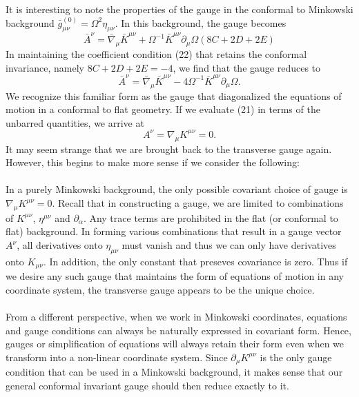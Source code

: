 \documentclass[10pt,letterpaper]{article}
\begin{document}
It is interesting to note the properties of the gauge in the conformal to Minkowski background $\bar g^{(0)}_{\mu\nu} = \Omega^2\eta_{\mu\nu}$. In this background, the gauge becomes
\begin{equation}
	\bar A^\nu  =\bar \nabla_\mu \bar K^{\mu\nu}+ \Omega^{-1}\bar K^{\mu\nu}\partial_\mu \Omega ( 8C +2D +2E)
\end{equation}
In maintaining the coefficient condition (22) that retains the conformal invariance, namely $8C+2D+2E=-4$, we find that the gauge reduces to
\begin{equation}
	\bar A^\nu =\bar \nabla_\mu \bar K^{\mu\nu} -4\Omega^{-1}\bar K^{\mu\nu}\partial_\mu \Omega.
\end{equation}
We recognize this familiar form as the gauge that diagonalized the equations of motion in a conformal to flat geometry. 
If we evaluate (21) in terms of the unbarred quantities, we arrive at
\begin{equation}
	A^\nu = \nabla_\mu K^{\mu\nu} =0.
\end{equation}
It may seem strange that we are brought back to the transverse gauge again. However, this begins to make more sense if we consider the following:
\\ \\
In a purely Minkowski background, the only possible covariant choice of gauge is $\nabla_\mu K^{\mu\nu} = 0$. Recall that in constructing a gauge, we are limited to combinations of $K^{\mu\nu}$, $\eta^{\mu\nu}$ and $\partial_\alpha$. Any trace terms are prohibited in the flat (or conformal to flat) background. In forming various combinations that result in a gauge vector $A^\nu$, all derivatives onto $\eta_{\mu\nu}$ must vanish and thus we can only have derivatives onto $K_{\mu\nu}$. In addition, the only constant that preseves covariance is zero. Thus if we desire any such gauge that maintains the form of equations of motion in any coordinate system, the transverse gauge appears to be the unique choice. 
\\ \\
From a different perspective, when we work in Minkowski coordinates, equations and gauge conditions can always be naturally expressed in covariant form. Hence, gauges or simplification of equations will always retain their form even when we transform into a non-linear coordinate system. Since $\partial_\mu K^{\mu\nu}$ is the only gauge condition that can be used in a Minkowski background, it makes sense that our general conformal invariant gauge should then reduce exactly to it. 
\\ \\
\end{document}
